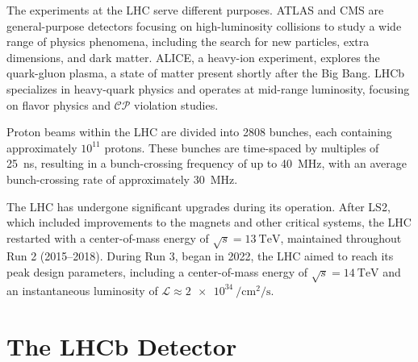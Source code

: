 The experiments at the LHC serve different purposes. ATLAS and CMS are general-purpose detectors focusing on high-luminosity collisions to study a wide range of physics phenomena, including the search for new particles, extra dimensions, and dark matter. ALICE, a heavy-ion experiment, explores the quark-gluon plasma, a state of matter present shortly after the Big Bang. LHCb specializes in heavy-quark physics and operates at mid-range luminosity, focusing on flavor physics and $\mathcal{CP}$ violation studies.

Proton beams within the LHC are divided into 2808 bunches, each containing approximately $10^{11}$ protons. These bunches are time-spaced by multiples of \SI{25}{\nano\second}, resulting in a bunch-crossing frequency of up to \SI{40}{\mega\hertz}, with an average bunch-crossing rate of approximately \SI{30}{\mega\hertz}. 

The LHC has undergone significant upgrades during its operation. After LS2, which included improvements to the magnets and other critical systems, the LHC restarted with a center-of-mass energy of $\sqrt{s}=\SI{13}{\tera\eV}$, maintained throughout Run 2 (2015–2018). During Run 3, began in 2022, the LHC aimed to reach its peak design parameters, including a center-of-mass energy of $\sqrt{s}=\SI{14}{\tera\eV}$ and an instantaneous luminosity of $\mathcal{L}\approx\SI{2e34}{\per\centi\meter\squared\per\second}$.


\section{The LHCb Detector}

